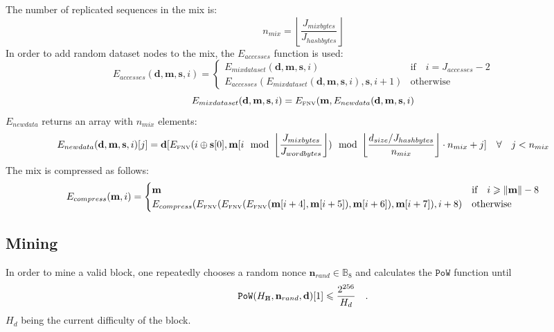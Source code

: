 \documentclass[9pt,oneside]{amsart}
\newcommand{\hcancel}[1]{%
    \tikz[baseline=(tocancel.base)]{
        \node[inner sep=0pt,outer sep=0pt] (tocancel) {#1};
        \draw[black] (tocancel.south west) -- (tocancel.north east);
    }%
}%
\begin{document}
The number of replicated sequences in the mix is:
\begin{equation}
 n_{mix} =  \left\lfloor\frac{J_{mixbytes}}{J_{hashbytes}}\right\rfloor
\end{equation}
In order to add random dataset nodes to the mix, the $E_{accesses}$ function is used:
\begin{equation}
 E_{accesses}(\mathbf{d}, \mathbf{m}, \mathbf{s}, i) = \begin{cases}
E_{mixdataset}(\mathbf{d}, \mathbf{m},  \mathbf{s}, i) & \text{if} \quad i = J_{accesses} -2 \\
E_{accesses}(E_{mixdataset}(\mathbf{d}, \mathbf{m}, \mathbf{s}, i), \mathbf{s}, i + 1) & \text{otherwise}
\end{cases}
\end{equation}
\begin{equation}
 E_{mixdataset}(\mathbf{d}, \mathbf{m}, \mathbf{s}, i) = E_\text{\tiny FNV}(\mathbf{m}, E_{newdata}(\mathbf{d}, \mathbf{m}, \mathbf{s}, i)
\end{equation}
$E_{newdata}$ returns an array with $n_{mix}$ elements:
\begin{equation}
 E_{newdata}(\mathbf{d}, \mathbf{m}, \mathbf{s}, i)[j] = \mathbf{d}[E_\text{\tiny FNV}(i \oplus \mathbf{s}[0], \mathbf{m}[i \mod \left\lfloor\frac{J_{mixbytes}}{J_{wordbytes}}\right\rfloor) \mod \left\lfloor\frac{d_{size} / J_{hashbytes}}{n_{mix}}\right\rfloor \cdot n_{mix} + j] \quad \forall \quad j < n_{mix}
\end{equation}
The mix is compressed as follows:
\begin{equation}
 E_{compress}(\mathbf{m}, i) = \begin{cases}
\mathbf{m} & \text{if} \quad i \geqslant \lVert \mathbf{m} \rVert - 8 \\
E_{compress}(E_\text{\tiny FNV}(E_\text{\tiny FNV}(E_\text{\tiny FNV}(\mathbf{m}[i + 4], \mathbf{m}[i + 5]), \mathbf{m}[i + 6]), \mathbf{m}[i + 7]), i + 8) & \text{otherwise}
\end{cases}
\end{equation}

\subsection{Mining}
In order to mine a valid block, one repeatedly chooses a random nonce $\mathbf{n}_{rand} \in \mathbb{B}_{8}$ and calculates the $\mathtt{PoW}$ function until
\begin{equation}
 \mathtt{PoW}(H_{\hcancel{n}}, \mathbf{n}_{rand}, \mathbf{d})[1] \leqslant \frac{2^{256}}{H_d}\quad.
\end{equation}
$H_d$ being the current difficulty of the block.
\end{document}
